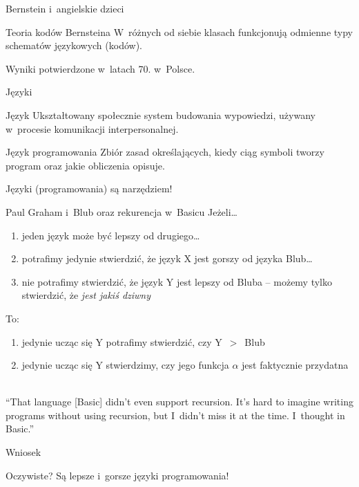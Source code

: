 \documentclass{beamer}
\begin{document}
\begin{frame}{Bernstein i~angielskie dzieci}
	\begin{alertblock}{Teoria kodów Bernsteina}
		W~różnych od siebie klasach funkcjonują odmienne typy schematów językowych (kodów).
	\end{alertblock}
	Wyniki potwierdzone w~latach 70. w~Polsce.
\end{frame}

\begin{frame}{Języki}
	\begin{block}{Język}
		Ukształtowany społecznie system budowania wypowiedzi, używany w~procesie komunikacji
		interpersonalnej.
	\end{block}
	\begin{block}{Język programowania}
		Zbiór zasad określających, kiedy ciąg symboli tworzy program oraz jakie
		obliczenia opisuje.
	\end{block}
	\pause
	\alert{Języki (programowania) są narzędziem!}
\end{frame}

\begin{frame}{Paul Graham i~Blub oraz rekurencja w~Basicu}
	Jeżeli\ldots
	\begin{enumerate}
		\item{jeden język może być lepszy od drugiego\ldots}
		\pause \item{potrafimy jedynie stwierdzić, że język X jest gorszy od języka Blub\ldots}
		\pause \item{nie potrafimy stwierdzić, że język Y jest lepszy od Bluba -- możemy
			tylko stwierdzić, że \emph{jest jakiś dziwny}}
	\end{enumerate}
	\pause
	To:
	\begin{enumerate}
		\item{jedynie ucząc się Y potrafimy stwierdzić, czy Y~$>$~Blub}
		\pause \item{jedynie ucząc się Y stwierdzimy, czy jego funkcja $\alpha$
			jest faktycznie przydatna}
	\end{enumerate}
	\pause
	\ \\
	``That language [Basic] didn't even support recursion. It's hard to imagine writing
	programs without using recursion, but I~didn't miss it at the time. I~thought in
	Basic.''
\end{frame}

\begin{frame}{Wniosek}
	\begin{alertblock}{Oczywiste?}
		Są lepsze i~gorsze języki programowania!
	\end{alertblock}
\end{frame}
\end{document}
